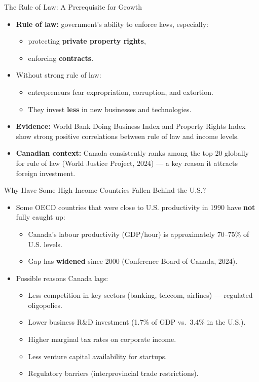 \documentclass[aspectratio=169]{beamer}
\begin{document}
\begin{frame}{The Rule of Law: A Prerequisite for Growth}
\transfade
\begin{itemize}[<+->]
  \item \textbf{Rule of law:} government's ability to enforce laws, especially:
  \begin{itemize}[<+->]
    \item protecting \textbf{private property rights},
    \item enforcing \textbf{contracts}.
  \end{itemize}
  \item Without strong rule of law:
  \begin{itemize}[<+->]
    \item entrepreneurs fear expropriation, corruption, and extortion.
    \item They invest \textbf{less} in new businesses and technologies.
  \end{itemize}
  \item \textbf{Evidence:} World Bank Doing Business Index and Property Rights Index show strong positive correlations between rule of law and income levels.
  \item \textbf{Canadian context:} Canada consistently ranks among the top 20 globally for rule of law (World Justice Project, 2024) --- a key reason it attracts foreign investment.
\end{itemize}
\end{frame}

\begin{frame}{Why Have Some High-Income Countries Fallen Behind the U.S.?}
\transfade
\begin{itemize}[<+->]
  \item Some OECD countries that were close to U.S. productivity in 1990 have \textbf{not} fully caught up:
  \begin{itemize}[<+->]
    \item Canada's labour productivity (GDP/hour) is approximately \alert{70--75\%} of U.S. levels.
    \item Gap has \textbf{widened} since 2000 (Conference Board of Canada, 2024).
  \end{itemize}
  \item Possible reasons Canada lags:
  \begin{itemize}[<+->]
    \item Less competition in key sectors (banking, telecom, airlines) --- regulated oligopolies.
    \item Lower business R\&D investment (1.7\% of GDP vs.\ 3.4\% in the U.S.).
    \item Higher marginal tax rates on corporate income.
    \item Less venture capital availability for startups.
    \item Regulatory barriers (interprovincial trade restrictions).
  \end{itemize}
\end{itemize}
\end{frame}
\end{document}
